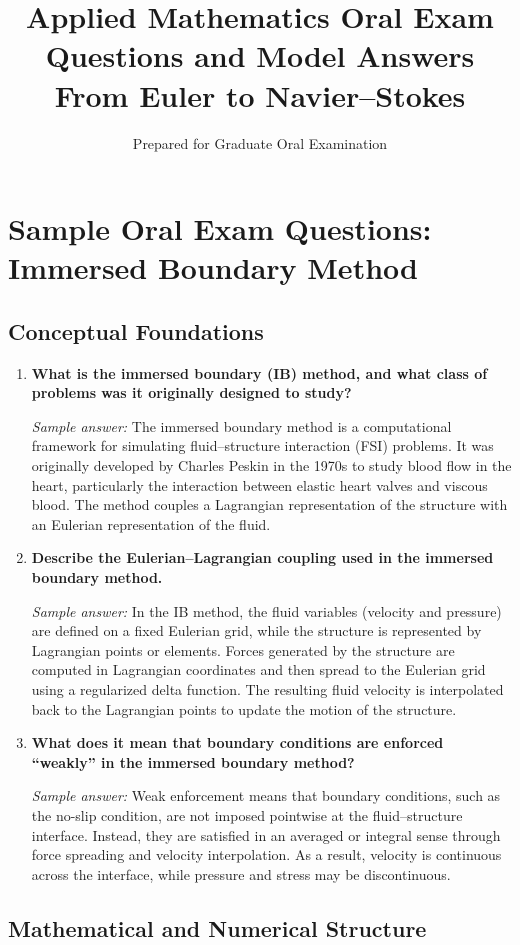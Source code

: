 \documentclass[12pt]{article}
\title{\vspace{-2em}\textbf{Applied Mathematics Oral Exam Questions and Model Answers}\\
\large From Euler to Navier--Stokes}
\author{Prepared for Graduate Oral Examination}
\date{}
\begin{document}
\section*{Sample Oral Exam Questions: Immersed Boundary Method}

\subsection*{Conceptual Foundations}

\begin{enumerate}
\item \textbf{What is the immersed boundary (IB) method, and what class of problems was it originally designed to study?}

\textit{Sample answer:}
The immersed boundary method is a computational framework for simulating fluid--structure interaction (FSI) problems. It was originally developed by Charles Peskin in the 1970s to study blood flow in the heart, particularly the interaction between elastic heart valves and viscous blood. The method couples a Lagrangian representation of the structure with an Eulerian representation of the fluid.

\item \textbf{Describe the Eulerian--Lagrangian coupling used in the immersed boundary method.}

\textit{Sample answer:}
In the IB method, the fluid variables (velocity and pressure) are defined on a fixed Eulerian grid, while the structure is represented by Lagrangian points or elements. Forces generated by the structure are computed in Lagrangian coordinates and then spread to the Eulerian grid using a regularized delta function. The resulting fluid velocity is interpolated back to the Lagrangian points to update the motion of the structure.

\item \textbf{What does it mean that boundary conditions are enforced “weakly” in the immersed boundary method?}

\textit{Sample answer:}
Weak enforcement means that boundary conditions, such as the no-slip condition, are not imposed pointwise at the fluid--structure interface. Instead, they are satisfied in an averaged or integral sense through force spreading and velocity interpolation. As a result, velocity is continuous across the interface, while pressure and stress may be discontinuous.
\end{enumerate}

\subsection*{Mathematical and Numerical Structure}
\end{document}
